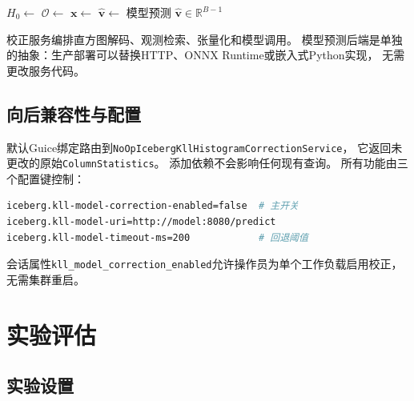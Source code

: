 \documentclass[runningheads]{llncs}
\begin{document}
\begin{algorithm}[t]
\caption{统计信息校正服务（接口）}
\label{alg:correction_iface}
\begin{algorithmic}[1]
  \State $H_0 \leftarrow$ 
  \State $\mathcal{O} \leftarrow$ 
  \State $\mathbf{x} \leftarrow$ 
    \Comment{\S\ref{sec:tensor}}
  \State $\hat{\mathbf{v}} \leftarrow$ 
  \State \Return {}
\EndProcedure
\Statex
{}
  \State \Return 模型预测 $\hat{\mathbf{v}} \in \mathbb{R}^{B-1}$
\EndProcedure
\end{algorithmic}
\end{algorithm}

校正服务编排直方图解码、观测检索、张量化和模型调用。
模型预测后端是单独的抽象：生产部署可以替换HTTP、ONNX Runtime或嵌入式Python实现，
无需更改服务代码。

\subsection{向后兼容性与配置}

默认Guice绑定路由到\texttt{NoOpIcebergKllHistogramCorrectionService}，
它返回未更改的原始\texttt{ColumnStatistics}。
添加依赖不会影响任何现有查询。
所有功能由三个配置键控制：

\begin{lstlisting}[language=bash]
iceberg.kll-model-correction-enabled=false  # 主开关
iceberg.kll-model-uri=http://model:8080/predict
iceberg.kll-model-timeout-ms=200            # 回退阈值
\end{lstlisting}

会话属性\texttt{kll\_model\_correction\_enabled}允许操作员为单个工作负载启用校正，
无需集群重启。

\section{实验评估}
\label{sec:experiments}

\subsection{实验设置}
\end{document}
